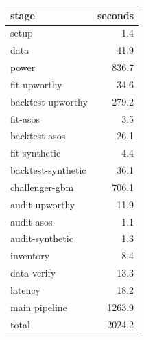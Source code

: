 \begin{tabular}{lr}
\toprule
stage & seconds \\
\midrule
setup & 1.4 \\
data & 41.9 \\
power & 836.7 \\
fit-upworthy & 34.6 \\
backtest-upworthy & 279.2 \\
fit-asos & 3.5 \\
backtest-asos & 26.1 \\
fit-synthetic & 4.4 \\
backtest-synthetic & 36.1 \\
challenger-gbm & 706.1 \\
audit-upworthy & 11.9 \\
audit-asos & 1.1 \\
audit-synthetic & 1.3 \\
inventory & 8.4 \\
data-verify & 13.3 \\
latency & 18.2 \\
\midrule
main pipeline & 1263.9 \\
total & 2024.2 \\
\bottomrule
\end{tabular}
